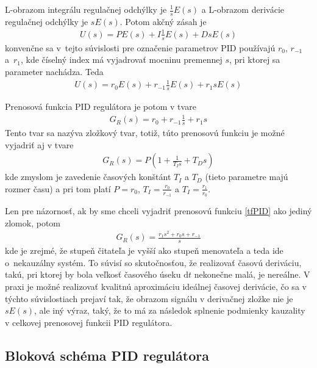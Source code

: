 \documentclass[a4paper, 10pt, ]{article}
\begin{document}
L-obrazom integrálu regulačnej odchýlky je $\frac{1}{s} E(s)$ a L-obrazom derivácie regulačnej odchýlky je $sE(s)$. Potom akčný zásah je
\begin{align}
    U(s) = P E(s) + I  \frac{1}{s} E(s) + D  sE(s)
\end{align}
konvenčne sa v~tejto súvislosti pre označenie parametrov PID používajú $r_0$, $r_{-1}$ a~$r_1$, kde číselný index má vyjadrovať mocninu premennej $s$, pri ktorej sa parameter nachádza. Teda
\begin{align}
    U(s) = r_0 E(s) + r_{-1}  \frac{1}{s} E(s) + r_1  sE(s)
\end{align}

Prenosová funkcia PID regulátora je potom v tvare
\begin{align} \label{tfPID}
    G_R(s) = r_0  + r_{-1}  \frac{1}{s}  + r_1  s
\end{align}
Tento tvar sa nazýva zložkový tvar, totiž, túto prenosovú funkciu je možné vyjadriť aj v tvare
\begin{align}
    G_R(s) = P \left( 1 +  \frac{1}{T_I s}  +  T_D  s \right)
\end{align}
kde zmyslom je zavedenie časových konštánt $T_I$ a $T_D$ (tieto parametre majú rozmer času) a pri tom platí $P = r_0$, $T_I = \frac{r_0}{r_{-1}}$ a $T_I = \frac{r_1}{r_0}$.

Len pre názornosť, ak by sme chceli vyjadriť prenosovú funkciu \eqref{tfPID} ako jediný zlomok, potom
\begin{align} \label{tfPID2}
    G_R(s) =  \frac{ r_1 s^2 + r_0 s + r_{-1} }{s}
\end{align}
kde je zrejmé, že stupeň čitateľa je vyšší ako stupeň menovateľa a teda ide o~nekauzálny systém. To súvisí so skutočnosťou, že realizovať časovú deriváciu, takú, pri ktorej by bola veľkosť časového úseku $\text{d}t$ nekonečne malá, je nereálne. V praxi je možné realizovať kvalitnú aproximáciu ideálnej časovej derivácie, čo sa v týchto súvislostiach prejaví tak, že obrazom signálu v derivačnej zložke nie je $sE(s)$, ale iný výraz, taký, že to má za následok splnenie podmienky kauzality v celkovej prenosovej funkcii PID regulátora.









\subsection{Bloková schéma PID regulátora}
\end{document}
